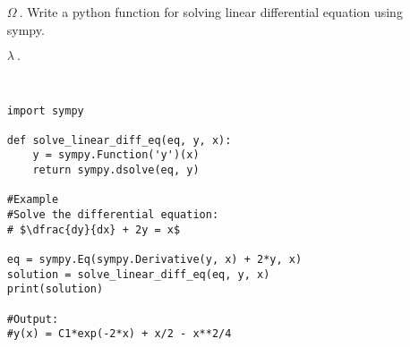 \documentclass{article}
\begin{document}
\pagecolor{BLUE20}
\ttfamily
\sloppy
\vspace*{\fill}
\begin{itemize}
	\item[\textcolor{GREEN10}{$\Omega ~.$}]\textcolor{GREEN10}{Write a python function for solving linear differential equation using sympy.}

	\item[\textcolor{WHITE01}{$\lambda ~.$}]
\begin{verbatim}


import sympy

def solve_linear_diff_eq(eq, y, x):
    y = sympy.Function('y')(x)
    return sympy.dsolve(eq, y)

#Example
#Solve the differential equation:
# $\dfrac{dy}{dx} + 2y = x$

eq = sympy.Eq(sympy.Derivative(y, x) + 2*y, x)
solution = solve_linear_diff_eq(eq, y, x)
print(solution)

#Output:
#y(x) = C1*exp(-2*x) + x/2 - x**2/4
\end{verbatim}
\end{itemize}
\vspace*{\fill}
\end{document}
